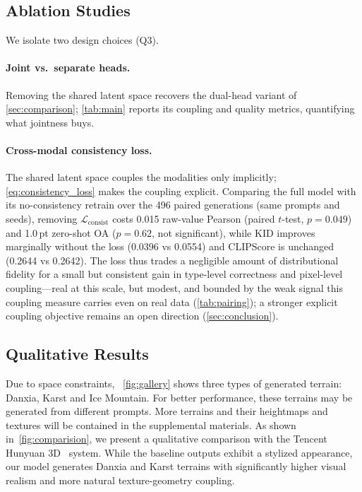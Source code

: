 \documentclass[review]{vgtc}                 %
\begin{document}
\subsection{Ablation Studies}
\label{sec:ablation}

We isolate two design choices (Q3).

\paragraph{Joint vs.\ separate heads.}
Removing the shared latent space recovers the dual-head variant of \cref{sec:comparison}; \cref{tab:main} reports its coupling and quality metrics, quantifying what jointness buys.

\paragraph{Cross-modal consistency loss.}
The shared latent space couples the modalities only implicitly; \cref{eq:consistency_loss} makes the coupling explicit.
Comparing the full model with its no-consistency retrain over the 496 paired generations (same prompts and seeds), removing $\mathcal{L}_{\text{consist}}$ costs 0.015 raw-value Pearson (paired $t$-test, $p=0.049$) and 1.0\,pt zero-shot OA ($p=0.62$, not significant), while KID improves marginally without the loss (0.0396 vs 0.0554) and CLIPScore is unchanged (0.2644 vs 0.2642).
The loss thus trades a negligible amount of distributional fidelity for a small but consistent gain in type-level correctness and pixel-level coupling---real at this scale, but modest, and bounded by the weak signal this coupling measure carries even on real data (\cref{tab:pairing}); a stronger explicit coupling objective remains an open direction (\cref{sec:conclusion}).


\subsection{Qualitative Results}
\label{sec:qualitative}
Due to space constraints, ~\cref{fig:gallery} shows three types of generated terrain: Danxia, Karst and Ice Mountain. For better performance, these terrains may be generated from different prompts. More terrains and their heightmaps and textures will be contained in the supplemental materials. As shown in~\cref{fig:comparision}, we present a qualitative comparison with the Tencent Hunyuan 3D~\cite{zhao2025hunyuan3d2} system. While the baseline outputs exhibit a stylized appearance, our model generates Danxia and Karst terrains with significantly higher visual realism and more natural texture-geometry coupling.
\end{document}
